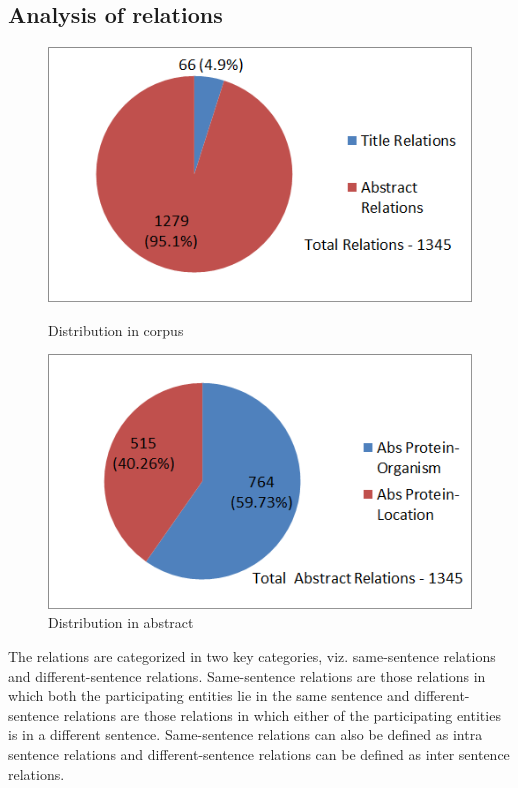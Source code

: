 \subsection*{Analysis of relations}

\begin{figure}
\centering
\begin{minipage}{.5\textwidth}
  \centering
  \includegraphics[width=.95\textwidth]{figures/Rel_Title_Abs_Distribution.png}
  \caption{Distribution in corpus}
  \label{fig:Rel_Title_Abs}
\end{minipage}%
\begin{minipage}{.5\textwidth}
  \centering
  \includegraphics[width=.95\textwidth]{figures/AbsRel_PO_PL_Distribution.png}
  \caption{Distribution in abstract}
  \label{fig:Rel_Abs_PO_PL}
\end{minipage}
\end{figure}

The relations are categorized in two key categories, viz. same-sentence relations and  different-sentence relations. Same-sentence relations are those relations in which both the participating entities lie in the same sentence and different-sentence relations are those relations in which either of the participating entities is in a different sentence. Same-sentence relations can also be defined as intra sentence relations and different-sentence relations can be defined as inter sentence relations.


